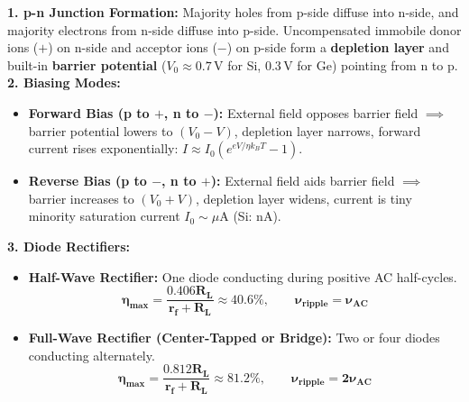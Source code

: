 \documentclass[10pt,a4paper]{article}
\begin{document}
\begin{formulabox}
\textbf{1. p-n Junction Formation:}
Majority holes from p-side diffuse into n-side, and majority electrons from n-side diffuse into p-side.
Uncompensated immobile donor ions ($+$) on n-side and acceptor ions ($-$) on p-side form a \textbf{depletion layer} and built-in \textbf{barrier potential} ($V_0 \approx 0.7\,\mathrm{V}$ for Si, $0.3\,\mathrm{V}$ for Ge) pointing from n to p.
\textbf{2. Biasing Modes:}
\begin{itemize}
  \item \textbf{Forward Bias (p to $+$, n to $-$):} External field opposes barrier field $\implies$ barrier potential lowers to $(V_0 - V)$, depletion layer narrows, forward current rises exponentially: $I \approx I_0 (e^{eV/\eta k_B T} - 1)$.
  \item \textbf{Reverse Bias (p to $-$, n to $+$):} External field aids barrier field $\implies$ barrier increases to $(V_0 + V)$, depletion layer widens, current is tiny minority saturation current $I_0 \sim \mu\mathrm{A}$ (Si: $\mathrm{nA}$).
\end{itemize}
\textbf{3. Diode Rectifiers:}
\begin{itemize}
  \item \textbf{Half-Wave Rectifier:} One diode conducting during positive AC half-cycles.
  \begin{equation}
    \mathbf{\eta_{\max} = \frac{0.406 R_L}{r_f + R_L} \approx 40.6\%}, \qquad \mathbf{\nu_{\text{ripple}} = \nu_{\text{AC}}}
  \end{equation}
  \item \textbf{Full-Wave Rectifier (Center-Tapped or Bridge):} Two or four diodes conducting alternately.
  \begin{equation}
    \mathbf{\eta_{\max} = \frac{0.812 R_L}{r_f + R_L} \approx 81.2\%}, \qquad \mathbf{\nu_{\text{ripple}} = 2\nu_{\text{AC}}}
  \end{equation}
\end{itemize}
\end{formulabox}
\end{document}
